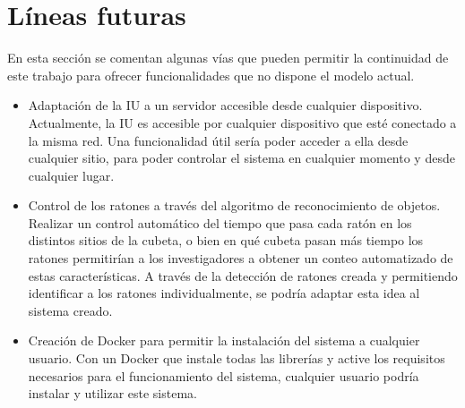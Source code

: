 \section{Líneas futuras}
En esta sección se comentan algunas vías que pueden permitir la continuidad de este trabajo para ofrecer funcionalidades que no dispone el modelo actual.
\begin{itemize}
\item Adaptación de la IU a un servidor accesible desde cualquier dispositivo. Actualmente, la IU es accesible por cualquier dispositivo que esté conectado a la misma red. Una funcionalidad útil sería poder acceder a ella desde cualquier sitio, para poder controlar el sistema en cualquier momento y desde cualquier lugar.
\item Control de los ratones a través del algoritmo de reconocimiento de objetos. Realizar un control automático del tiempo que pasa cada ratón en los distintos sitios de la cubeta, o bien en qué cubeta pasan más tiempo los ratones permitirían a los investigadores a obtener un conteo automatizado de estas características. A través de la detección de ratones creada y permitiendo identificar a los ratones individualmente, se podría adaptar esta idea al sistema creado.
\item Creación de Docker para permitir la instalación del sistema a cualquier usuario. Con un Docker que instale todas las librerías y active los requisitos necesarios para el funcionamiento del sistema, cualquier usuario podría instalar y utilizar este sistema.
\end{itemize}



